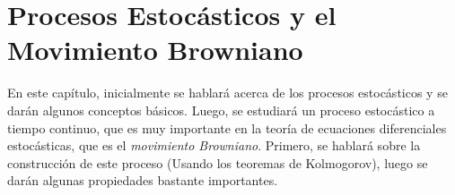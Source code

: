 \chapter{Procesos Estocásticos y el Movimiento Browniano}

En este capítulo, inicialmente se hablará acerca de los procesos estocásticos y se darán algunos conceptos básicos. Luego, se estudiará un proceso estocástico a tiempo continuo, que es muy importante en la teoría de ecuaciones diferenciales estocásticas, que es el \textit{movimiento Browniano}. Primero, se hablará sobre la construcción de este proceso (Usando los teoremas de Kolmogorov), luego se darán algunas propiedades bastante importantes.
























